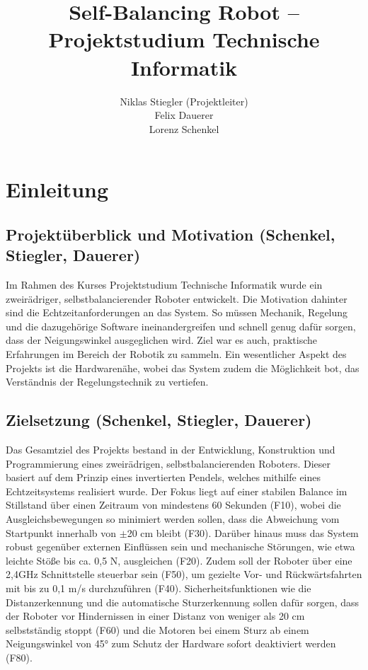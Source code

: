 \documentclass[fontsize=12pt,
parskip=half,	%
department=FakM,  %
logostyle=flat,
twoside, %
DIV=15,BCOR=10mm, %
]{OTHRreprt}
\title{Self-Balancing Robot -- Pro\-jekt\-stu\-di\-um Technische Informatik}
\author{Niklas Stiegler (Projektleiter) \\ Felix Dauerer \\ Lorenz Schenkel}
\begin{document}
\maketitle




\tableofcontents
\cleardoublepage




\chapter{Einleitung }
\label{ch:einleitung}

\section{Projektüberblick und Motivation (Schenkel, Stiegler, Dauerer)}
\label{sec:projektueberblick}

Im Rahmen des Kurses Projektstudium Technische Informatik wurde ein zweirädriger, selbstbalancierender Roboter entwickelt. Die Motivation dahinter sind die Echtzeitanforderungen an das System. So müssen Mechanik, Regelung und die dazugehörige Software ineinandergreifen und schnell genug dafür sorgen, dass der Neigungswinkel ausgeglichen wird. Ziel war es auch, praktische Erfahrungen im Bereich der Robotik zu sammeln. Ein wesentlicher Aspekt des Projekts ist die Hardwarenähe, wobei das System zudem die Möglichkeit bot, das Verständnis der Regelungstechnik zu vertiefen.


\section{Zielsetzung (Schenkel, Stiegler, Dauerer)}
\label{sec:zielsetzung}
Das Gesamtziel des Projekts bestand in der Entwicklung, Konstruktion und Programmierung eines zweirädrigen, selbstbalancierenden Roboters. Dieser basiert auf dem Prinzip eines invertierten Pendels, welches mithilfe eines Echtzeitsystems realisiert wurde. Der Fokus liegt auf einer stabilen Balance im Stillstand über einen Zeitraum von mindestens 60 Sekunden (F10), wobei die Ausgleichsbewegungen so minimiert werden sollen, dass die Abweichung vom Startpunkt innerhalb von $\pm$20 cm bleibt (F30). Darüber hinaus muss das System robust gegenüber externen Einflüssen sein und mechanische Störungen, wie etwa leichte Stöße bis ca. 0,5 N, ausgleichen (F20). Zudem soll der Roboter über eine 2,4GHz Schnittstelle steuerbar sein (F50), um gezielte Vor- und Rückwärtsfahrten mit bis zu 0,1 m/s durchzuführen (F40). Sicherheitsfunktionen wie die Distanzerkennung und die automatische Sturzerkennung sollen dafür sorgen, dass der Roboter vor Hindernissen in einer Distanz von weniger als 20 cm selbstständig stoppt (F60) und die Motoren bei einem Sturz ab einem Neigungswinkel von 45° zum Schutz der Hardware sofort deaktiviert werden (F80).
\end{document}

